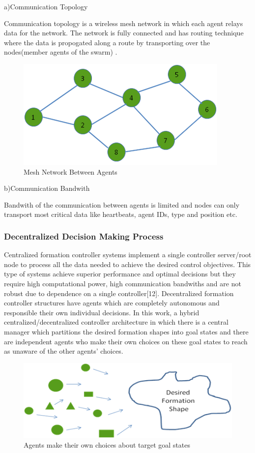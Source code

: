 \documentclass[twoside]{article}
\begin{document}
a)Communication Topology


Communication topology is a wireless mesh network in which each agent relays data for the network. The network is fully connected and has routing technique where the data is propogated along a route by transporting over the nodes(member agents of the swarm) . 

\begin{figure}[H]
	\caption{Mesh Network Between Agents}
	\centering
	\includegraphics[scale = 1]{mesh}
\end{figure} 

b)Communication Bandwith

Bandwith of the communication between agents is limited and nodes can only transport most critical data like heartbeats, agent IDs, type and position etc. 



\subsubsection{ Decentralized Decision Making Process}

Centralized formation controller systems implement a single controller  server/root node
to process all the data needed to achieve the desired control objectives. This type of systems achieve superior performance and optimal decisions  but they require high computational power, high communication bandwiths and are not robust due to dependence on a single controller[12]. Decentralized formation controller structures have agents which are completely autonomous and responsible their own individual decisions. In this work, a hybrid centralized/decentralized controller architecture in which there is a central manager which partitions the desired formation shapes into goal states and there are independent agents who make their own choices on these goal states to reach as unaware of the other agents' choices. 


\begin{figure}[H]
	\caption{Agents make their own choices about target goal states}
	\centering
	\includegraphics[scale = 1]{decentralized}
\end{figure} 
\end{document}
